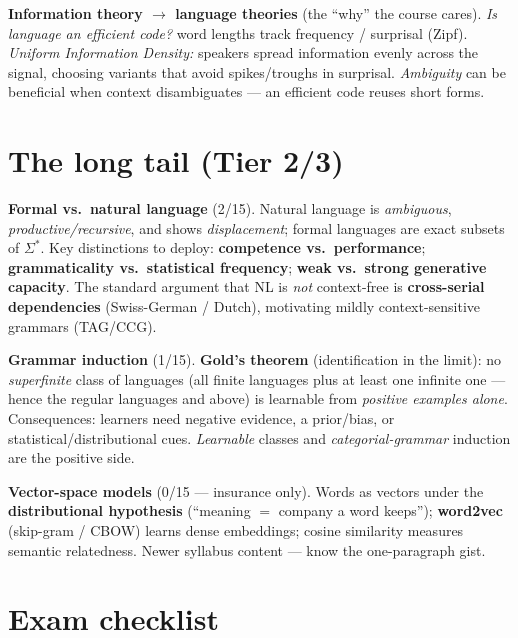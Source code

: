 \documentclass[11pt,a4paper]{article}
\begin{document}
\begin{useful}
\textbf{Information theory $\to$ language theories} (the ``why'' the course cares). \emph{Is language an efficient code?} word lengths track frequency / surprisal (Zipf). \emph{Uniform Information Density:} speakers spread information evenly across the signal, choosing variants that avoid spikes/troughs in surprisal. \emph{Ambiguity} can be beneficial when context disambiguates --- an efficient code reuses short forms.
\end{useful}

\section{The long tail (Tier 2/3)}

\textbf{Formal vs.\ natural language} (2/15). Natural language is \emph{ambiguous}, \emph{productive/recursive}, and shows \emph{displacement}; formal languages are exact subsets of $\Sigma^*$. Key distinctions to deploy: \textbf{competence vs.\ performance}; \textbf{grammaticality vs.\ statistical frequency}; \textbf{weak vs.\ strong generative capacity}. The standard argument that NL is \emph{not} context-free is \textbf{cross-serial dependencies} (Swiss-German / Dutch), motivating mildly context-sensitive grammars (TAG/CCG).

\textbf{Grammar induction} (1/15). \textbf{Gold's theorem} (identification in the limit): no \emph{superfinite} class of languages (all finite languages plus at least one infinite one --- hence the regular languages and above) is learnable from \emph{positive examples alone}. Consequences: learners need negative evidence, a prior/bias, or statistical/distributional cues. \emph{Learnable} classes and \emph{categorial-grammar} induction are the positive side.

\textbf{Vector-space models} (0/15 --- insurance only). Words as vectors under the \textbf{distributional hypothesis} (``meaning $=$ company a word keeps''); \textbf{word2vec} (skip-gram / CBOW) learns dense embeddings; cosine similarity measures semantic relatedness. Newer syllabus content --- know the one-paragraph gist.

\section*{Exam checklist}
\end{document}
